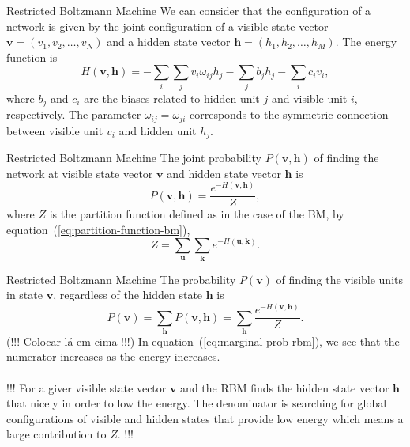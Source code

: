 \begin{frame}{Restricted Boltzmann Machine}
    \justifying%
    We can consider that the configuration of a network is given by the joint configuration of a visible state vector $\mathbf{v} = (v_{1}, v_{2}, \dots, v_{N})$ and a hidden state vector $\mathbf{h} = (h_{1}, h_{2}, \dots, h_{M})$. The energy function is
    \begin{equation}
        \label{eq:energy-function-rbm}
        H(\mathbf{v}, \mathbf{h}) = - \sum_{i} \sum_{j} v_{i} \omega_{ij} h_{j} - \sum_{j} b_{j} h_{j} - \sum_{i} c_{i} v_{i},
    \end{equation}
    where $b_{j}$ and $c_{i}$ are the biases related to hidden unit $j$ and visible unit $i$, respectively. The parameter $\omega_{ij} = \omega_{ji}$ corresponds to the symmetric connection between visible unit $v_{i}$ and hidden unit $h_{j}$.
\end{frame}


\begin{frame}{Restricted Boltzmann Machine}
    \justifying%
    The joint probability $P(\mathbf{v}, \mathbf{h})$ of finding the network at visible state vector $\mathbf{v}$ and hidden state vector $\mathbf{h}$ is
    \begin{equation}
        \label{eq:joint-prob-rbm}
        P(\mathbf{v}, \mathbf{h}) = \frac{e^{-H(\mathbf{v}, \mathbf{h})}}{Z},
    \end{equation}
    where $Z$ is the partition function defined as in the case of the BM, by equation~(\ref{eq:partition-function-bm}),
    \begin{equation}
        \label{eq:partition-function-rbm}
        Z = \sum_{\mathbf{u}} \sum_{\mathbf{k}} e^{-H(\mathbf{u}, \mathbf{k})}.
    \end{equation}
\end{frame}


\begin{frame}{Restricted Boltzmann Machine}
    \justifying%
    The probability $P(\mathbf{v})$ of finding the visible units in state $\mathbf{v}$, regardless of the hidden state $\mathbf{h}$ is
    \begin{equation}
        \label{eq:marginal-prob-rbm}
        P(\mathbf{v}) = \sum_{\mathbf{h}} P(\mathbf{v}, \mathbf{h}) = \sum_{\mathbf{h}} \frac{e^{-H(\mathbf{v}, \mathbf{h})}}{Z}.
    \end{equation}
    (!!! Colocar lá em cima !!!) In equation~(\ref{eq:marginal-prob-rbm}), we see that the numerator increases as the energy increases. 
    \\~\\
    !!! For a giver visible state vector $\mathbf{v}$ and the RBM finds the hidden state vector $\mathbf{h}$ that nicely in order to low the energy. The denominator is searching for global configurations of visible and hidden states that provide low energy which means a large contribution to $Z$. !!! 
\end{frame}



